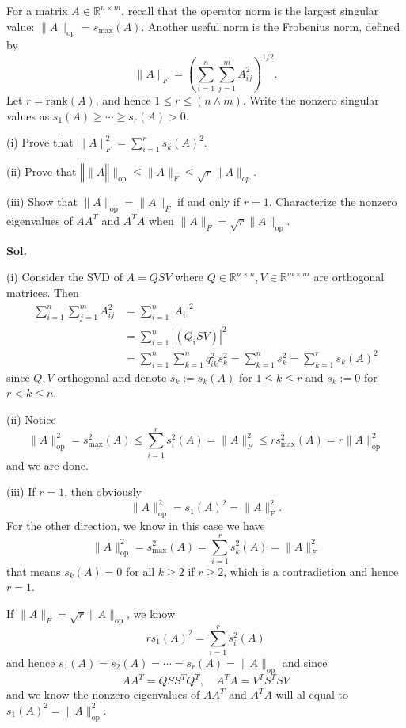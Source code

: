\documentclass[lang=en,11pt,a4paper,citestyle =authoryear]{elegantpaper}
\newcommand{\R}{\mathbb{R}}
\begin{document}
For a matrix $A \in \R^{n\times m}$, recall that the operator norm is the largest singular value: $\lVert A\rVert_{\text{op}} = s_{\max}(A)$.
Another useful norm is the Frobenius norm, defined by
\[\lVert A\rVert_F = \left(\sum\limits_{i=1}^n\sum\limits_{j=1}^m A_{ij}^2\right)^{1/2}.\]
Let $r = \text{rank}(A)$, and hence $1 \leq r \leq (n\wedge m)$. Write the nonzero singular values as $s_1(A) \geq \cdots \geq
s_r (A) > 0$.\par
(i) Prove that $\lVert A\rVert_F^2 = \sum\limits_{i=1}^r s_k(A)^2$.\par
(ii) Prove that $‖\lVert A‖\rVert_{\text{op}} \leq \lVert A\rVert_F \leq \sqrt{r} \lVert A\rVert_{op}$.\par
(iii) Show that $\lVert A\rVert_{\text{op}} = \lVert A\rVert_F$ if and only if $r = 1$. Characterize the nonzero eigenvalues of $AA^T$ and $A^TA$ when $\lVert A\rVert_F = \sqrt{r} \rVert A\rVert_{\text{op}}$.\par
\vspace{0.5em}
\textbf{Sol.} \par
(i) Consider the SVD of $A = QSV$ where $Q \in \R^{n\times n}, V\in \R^{m\times m}$ are orthogonal matrices. Then
\[
\begin{aligned}
\sum\limits_{i=1}^n\sum\limits_{j=1}^m A_{ij}^2 &= \sum\limits_{i=1}^n |A_i|^2 \\
&= \sum\limits_{i=1}^n |(Q_iSV)|^2 \\
&= \sum\limits_{i=1}^n \sum\limits_{k=1}^nq_{ik}^2s_k^2 =  \sum\limits_{k=1}^n s_k^2 = \sum\limits_{k=1}^r s_k(A)^2
\end{aligned}
\]
since $Q,V$ orthogonal and denote $s_k := s_k(A)$ for $1\leq k \leq r$ and $s_k:= 0$ for $r<k\leq n$.\par
(ii) Notice
\[\lVert A\rVert_{\text{op}}^2 = s_{\max}^2(A) \leq \sum\limits_{i=1}^r   s_i^2(A) = \lVert A\rVert_{F}^2 \leq rs_{\max}^2(A) = r\lVert A\rVert_{\text{op}}^2\]
and we are done.\par
(iii) If $r = 1$, then obviously
\[
    \lVert A\rVert_{\text{op}}^2 = s_1(A)^2 = \lVert A\rVert_{\text{F}}^2.
\]
For the other direction, we know in this case we have
\[
\lVert A\rVert_{\text{op}}^2 = s_{\max}^2(A) = \sum\limits_{i=1}^r s_k^2(A) = \lVert A\rVert_{F}^2
\]
that means $s_k(A) = 0$ for all $k\geq 2$ if $r\geq 2$, which is a contradiction and hence $r = 1$.\par
If $\lVert A\rVert_{F} = \sqrt{r}\lVert A\rVert_{\text{op}}$, we know
\[
rs_1(A)^2 = \sum\limits_{i=1}^r   s_i^2(A)
\]
and hence $s_1(A) = s_2(A) = \cdots = s_r(A) = \lVert A\rVert_{\text{op}}$ and since
\[
AA^T = QSS^TQ^T,\quad A^TA = V^TS^TSV
\]
and we know the nonzero eigenvalues of $AA^T$ and $A^TA$ will al equal to $s_1(A)^2 = \lVert A\rVert_{\text{op}}^2$.
\vspace{0.5em}
\end{document}
